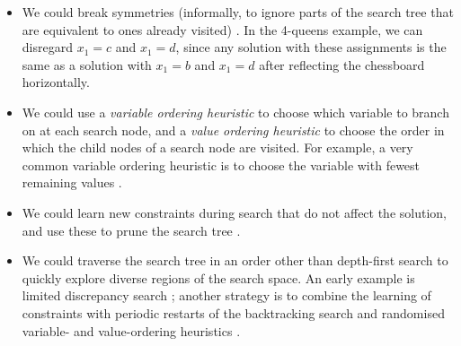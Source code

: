 \begin{itemize}
    \item We could break symmetries (informally, to ignore parts of the search tree
        that are equivalent to ones already visited) \citep{DBLP:reference/fai/GentPP06}.
	In the 4-queens example,
        we can disregard $x_1=c$ and $x_1=d$, since any solution with these assignments
        is the same as a solution with $x_1=b$ and $x_1=d$ after reflecting the chessboard
        horizontally.
    \item We could use a \emph{variable ordering heuristic} to choose which variable
    	to branch on at each search node, and a \emph{value ordering heuristic} to choose
	the order in which the child nodes of a search node are visited.
	For example, a very common variable ordering heuristic is to choose the variable
	with fewest remaining values \citep{golomb1965backtrack}.
    \item We could learn new constraints during search that do not affect the solution,
    	and use these to prune the search tree \citep{DBLP:conf/aaai/KatsirelosB05}.
    \item We could traverse the search tree in an order other than depth-first search
    	to quickly explore diverse regions of the search space.  An early
	example is limited discrepancy search \citep{DBLP:conf/ijcai/HarveyG95};
	another strategy is to combine the learning of constraints with periodic
	restarts of the backtracking search and randomised variable- and value-ordering
	heuristics
	\citep{DBLP:journals/jsat/LecoutreSTV07,DBLP:conf/cpaior/ArchibaldDHMP019}.
\end{itemize}

